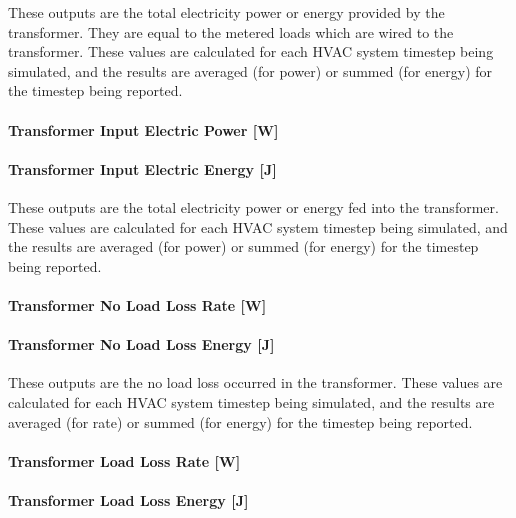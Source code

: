 These outputs are the total electricity power or energy provided by the transformer. They are equal to the metered loads which are wired to the transformer. These values are calculated for each HVAC system timestep being simulated, and the results are averaged (for power) or summed (for energy) for the timestep being reported.

\paragraph{Transformer Input Electric Power {[}W{]}}\label{transformer-input-electric-power-w}

\paragraph{Transformer Input Electric Energy {[}J{]}}\label{transformer-input-electric-energy-j}

These outputs are the total electricity power or energy fed into the transformer. These values are calculated for each HVAC system timestep being simulated, and the results are averaged (for power) or summed (for energy) for the timestep being reported.

\paragraph{Transformer No Load Loss Rate {[}W{]}}\label{transformer-no-load-loss-rate-w}

\paragraph{Transformer No Load Loss Energy {[}J{]}}\label{transformer-no-load-loss-energy-j}

These outputs are the no load loss occurred in the transformer. These values are calculated for each HVAC system timestep being simulated, and the results are averaged (for rate) or summed (for energy) for the timestep being reported.

\paragraph{Transformer Load Loss Rate {[}W{]}}\label{transformer-load-loss-rate-w}

\paragraph{Transformer Load Loss Energy {[}J{]}}\label{transformer-load-loss-energy-j}

